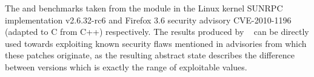 The  and  benchmarks taken from the  module in the Linux kernel SUNRPC implementation v2.6.32-rc6 and Firefox 3.6 security advisory CVE-2010-1196 (adapted to C from C++) respectively. The results produced by \tool~ can be directly used towards exploiting known security flaws mentioned in advisories from which these patches originate, as the resulting abstract state describes the difference between versions which is exactly the range of exploitable values.

%
%
%
%
